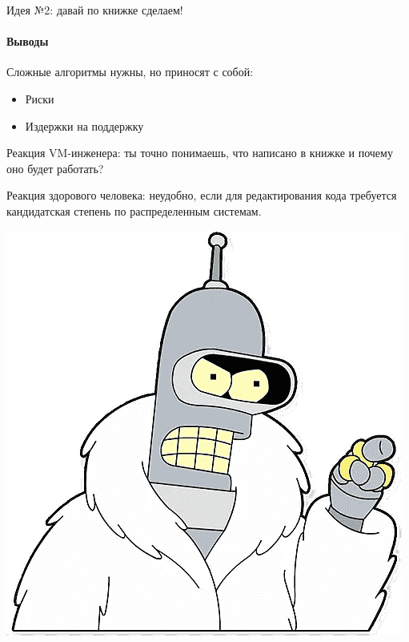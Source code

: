 \begin{frame}[t]{Идея №2: давай по книжке сделаем!}
\framesubtitle{Выводы}

Сложные алгоритмы нужны, но приносят с собой:
\begin{itemize}
  \item Риски
  \item Издержки на поддержку
\end{itemize}


\pause
Реакция VM-инженера: ты точно понимаешь, что написано в книжке и почему оно будет работать?

\pause
Реакция здорового человека: неудобно, если для редактирования кода требуется кандидатская степень по распределенным системам. 

\pause
\includegraphics[width=.3\textwidth]{production/kiss/2-bender-kiss.png}



\end{frame}



